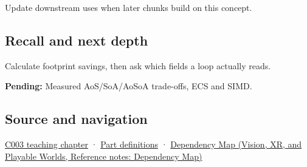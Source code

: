 \hypertarget{appendix-5522ad176ca0-used-by}{}

Update downstream uses when later chunks build on this concept.

\subsection{Recall and next depth}\label{appendix-5522ad176ca0-recall-and-next-depth}

\hypertarget{appendix-5522ad176ca0-recall-and-next-depth}{}

Calculate footprint savings, then ask which fields a loop actually reads.

\textbf{Pending:} Measured AoS/SoA/AoSoA trade-offs, ECS and SIMD.

\subsection{Source and navigation}\label{appendix-5522ad176ca0-source-and-navigation}

\hypertarget{appendix-5522ad176ca0-source-and-navigation}{}

\hyperref[01-foundations-i-ch002-where-the-bytes-live]{C003 teaching chapter} · \hyperref[appendix-fd090d982a15-m003---parts-41-60]{Part definitions} · \href{../07-Vision-XR-and-Playable-Worlds/main.pdf\#nameddest=appendix-4ad47bdd269a}{Dependency Map (Vision, XR, and Playable Worlds, Reference notes: Dependency Map)}
